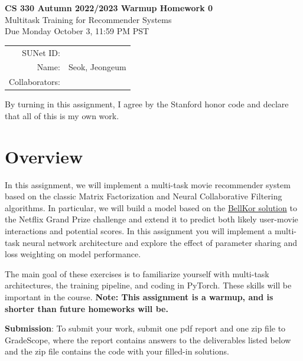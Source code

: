 \documentclass[12pt]{article}
\begin{document}
\begin{center}
{\Large \textbf{CS 330 Autumn 2022/2023 Warmup Homework 0} \\ Multitask Training for Recommender Systems
\\ Due Monday October 3, 11:59 PM PST}
\vspace{0.2cm}

\begin{tabular}{rl}
SUNet ID: &  \\
Name: & Seok, Jeongeum\\
Collaborators: & 
\end{tabular}
\end{center}

By turning in this assignment, I agree by the Stanford honor code and declare
that all of this is my own work.



\section{Overview}
In this assignment, we will implement a multi-task movie recommender system based on the classic Matrix Factorization \cite{Yehuda2009matrix} and Neural Collaborative Filtering ~\cite{he2017neural} algorithms. In particular, we will build a model based on the \href{https://www2.seas.gwu.edu/~simhaweb/champalg/cf/papers/KorenBellKor2009.pdf}{BellKor solution} to the Netflix Grand Prize challenge and extend it to predict both likely user-movie interactions and potential scores. In this assignment you will implement a multi-task neural network architecture and explore the effect of parameter sharing and loss weighting on model performance.

\vspace{0.2cm}
\noindent The main goal of these exercises is to familiarize yourself with multi-task architectures, the training pipeline, and coding in PyTorch. These skills will be important in the course. \textbf{Note: This assignment is a warmup, and is shorter than future homeworks will be.}

\vspace{0.2cm}

\noindent\textbf{Submission}: To submit your work, submit one pdf report and one zip file to GradeScope, where the report contains answers to the deliverables listed below and the zip file contains the code with your filled-in solutions. 
\end{document}
